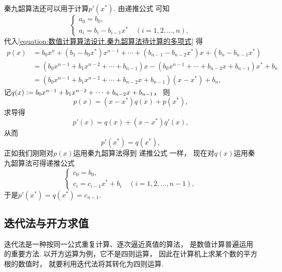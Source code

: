 秦九韶算法还可以用于计算\(p'(x^*)\).
由递推公式  可知\begin{equation*}
	\begin{cases}
		a_0 = b_0, \\
		a_i = b_i - b_{i-1} x^*
		\quad(i=1,2,\dotsc,n),
	\end{cases}
\end{equation*}
代入\cref{equation:数值计算算法设计.秦九韶算法待计算的多项式} 得\begin{align*}
	p(x)
	&= b_0 x^n + (b_1 - b_0 x^*) x^{n-1} + \dotsb + (b_{n-1} - b_{n-2} x^*) x + (b_n - b_{n-1} x^*) \\
	&= (b_0 x^{n-1} + b_1 x^{n-2} + \dotsb + b_{n-1}) x
		- (b_0 x^{n-1} + \dotsb + b_{n-2} x + b_{n-1}) x^*
		+ b_n \\
	&= (b_0 x^{n-1} + b_1 x^{n-2} + \dotsb + b_{n-2} x + b_{n-1}) (x - x^*) + b_n,
\end{align*}
记\(q(x) := b_0 x^{n-1} + b_1 x^{n-2} + \dotsb + b_{n-2} x + b_{n-1}\)，
则\begin{equation*}
	p(x) = (x - x^*) q(x) + p(x^*),
\end{equation*}
求导得\begin{equation*}
	p'(x) = q(x) + (x - x^*) q'(x),
\end{equation*}
从而\begin{equation*}
	p'(x^*) = q(x^*),
\end{equation*}
正如我们刚刚对\(p(x)\)运用秦九韶算法得到
递推公式  一样，
现在对\(q(x)\)运用秦九韶算法可得递推公式\begin{equation*}
	\begin{cases}
		c_0 = b_0, \\
		c_i = c_{i-1} x^* + b_i
		\quad(i=1,2,\dotsc,n-1),
	\end{cases}
\end{equation*}
于是\(p'(x^*) = q(x^*) = c_{n-1}\).

\subsection{迭代法与开方求值}
迭代法是一种按同一公式重复计算、逐次逼近真值的算法，
是数值计算普遍运用的重要方法.
以开方运算为例，它不是四则运算，
因此在计算机上求某个数的平方根的数值时，
就要利用迭代法将其转化为四则运算.

